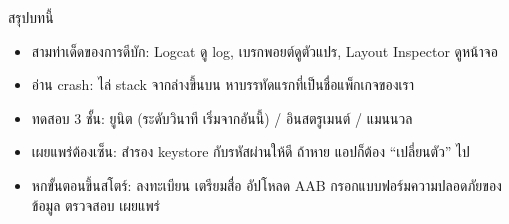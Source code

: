 \begin{tcbsummary}{สรุปบทนี้}
\begin{itemize}
  \item สามท่าเด็ดของการดีบัก: Logcat ดู log, เบรกพอยต์ดูตัวแปร, Layout Inspector ดูหน้าจอ
  \item อ่าน crash: ไล่ stack จากล่างขึ้นบน หาบรรทัดแรกที่เป็นชื่อแพ็กเกจของเรา
  \item ทดสอบ 3 ชั้น: ยูนิต (ระดับวินาที เริ่มจากอันนี้) / อินสตรูเมนต์ / แมนนวล
  \item เผยแพร่ต้องเซ็น: สำรอง keystore กับรหัสผ่านให้ดี ถ้าหาย แอปก็ต้อง “เปลี่ยนตัว” ไป
  \item หกขั้นตอนขึ้นสโตร์: ลงทะเบียน เตรียมสื่อ อัปโหลด AAB กรอกแบบฟอร์มความปลอดภัยของข้อมูล ตรวจสอบ เผยแพร่
\end{itemize}

\end{tcbsummary}

